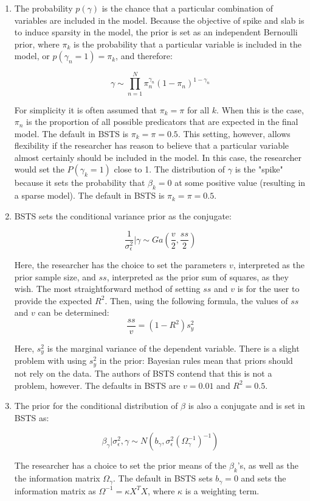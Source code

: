 \documentclass[11pt, oneside]{book}   	%
\begin{document}
\begin{enumerate}
\item The probability $p(\gamma)$ is the chance that a particular combination of variables are included in the model.  Because the objective of spike and slab is to induce sparsity in the model, the prior is set as an independent Bernoulli prior, where $\pi_k$ is the probability that a particular variable is included in the model, or $p(\gamma_n = 1) = \pi_{k}$, and therefore:

$$\gamma \sim \prod_{n=1}^{N} \pi_{n}^{\gamma_{n}}(1-\pi_{n})^{1-\gamma_{n}}$$

For simplicity it is often assumed that $\pi_k = \pi$ for all $k$. When this is the case, $\pi_{n}$ is the proportion of all possible predicators that are expected in the final model. The default in BSTS is $\pi_{k}=\pi=0.5$. This setting, however, allows flexibility if the researcher has reason to believe that a particular variable almost certainly should be included in the model. In this case, the researcher would set the $P(\gamma_{k} = 1)$ close to 1. The distribution of $\gamma$ is the "spike" because it sets the probability that $\beta_k = 0$ at some positive value (resulting in a sparse model). The default in BSTS is $\pi_{k}=\pi=0.5$.

\item BSTS sets the conditional variance prior as the conjugate:

$$ \frac{1}{\sigma_{\epsilon}^{2}} | \gamma \sim Ga(\frac{v}{2}, \frac{ss}{2}) $$

Here, the researcher has the choice to set the parameters $v$, interpreted as the prior sample size, and $ss$, interpreted as the prior sum of squares, as they wish. The most straightforward method of setting $ss$ and $v$ is for the user to provide the expected $R^{2}$. Then, using the following formula, the values of $ss$ and $v$ can be determined:
$$\frac{ss}{v} = (1-R^2)s_{y}^{2}$$

Here, $s_{y}^{2}$ is the marginal variance of the dependent variable. There is a slight problem with using $s_{y}^{2}$ in the prior: Bayesian rules mean that priors should not rely on the data. The authors of BSTS contend that this is not a problem, however. The defaults in BSTS are $v = 0.01$ and $R^{2}=0.5$. 

\item The prior for the conditional distribution of $\beta$ is also a conjugate and is set in BSTS as:

$$ \beta_{\gamma} | \sigma_{\epsilon}^{2} , \gamma \sim N(b_{\gamma}, \sigma_{\epsilon}^{2}(\Omega_{\gamma}^{-1})^{-1}) $$

The researcher has a choice to set the prior means of the $\beta_{k}$'s, as well as the the information matrix $\Omega_{\gamma}$. The default in BSTS sets $b_{\gamma}=0$ and sets the information matrix as $\Omega^{-1}=\kappa {X^{T}X}$, where $\kappa$ is a weighting term. 


\end{enumerate}
\end{document}
